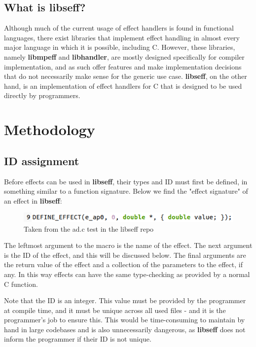 \documentclass[logo,bsc,singlespacing,parskip,online]{infthesis}
\begin{document}
\section{What is libseff?}

Although much of the current usage of effect handlers is found in functional languages, there exist libraries that implement effect handling in almost every major language in which it is possible, including C. However, these libraries, namely \textbf{libmpeff} and \textbf{libhandler}, are mostly designed specifically for compiler implementation, and as such offer features and make implementation decisions that do not necessarily make sense for the generic use case.\citep{libmprompt} \textbf{libseff}, on the other hand, is an implementation of effect handlers for C that is designed to be used directly by programmers.\citep{libseff_paper}








\chapter{Methodology} \label{method}

\section{ID assignment}

Before effects can be used in \textbf{libseff}, their types and ID must first be defined, in something similar to a function signature. Below we find the "effect signature" of an effect in \textbf{libseff}:

\begin{figure}[ht]
    \centering
    \includegraphics[width=0.9\linewidth]{eff_def.png}
    \caption{Taken from the ad.c test in the libseff repo}
\end{figure}

The leftmost argument to the macro is the name of the effect. The next argument is the ID of the effect, and this will be discussed below. The final arguments are the return value of the effect and a collection of the parameters to the effect, if any. In this way effects can have the same type-checking as provided by a normal C function.

Note that the ID is an integer. This value must be provided by the programmer at compile time, and it must be unique across all used files - and it is the programmer's job to ensure this. This would be time-consuming to maintain by hand in large codebases and is also unnecessarily dangerous, as \textbf{libseff} does not inform the programmer if their ID is not unique.
\end{document}
